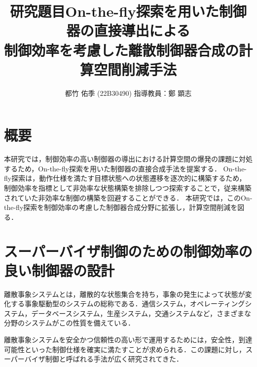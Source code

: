 \documentclass[11pt]{jarticle}
\begin{document}

\title{研究題目}
\title{On-the-fly探索を用いた制御器の直接導出による\\制御効率を考慮した離散制御器合成の計算空間削減手法}
\author{都竹 佑季 (22B30490) \;\; 指導教員：鄭 顕志}
\date{\empty} %
\maketitle %
\thispagestyle{fancy}


\section{概要} %
本研究では，制御効率の高い制御器の導出における計算空間の爆発の課題に対処するため，On-the-fly探索を用いた制御器の直接合成手法を提案する．
On-the-fly探索は，動作仕様を満たす目標状態への状態遷移を逐次的に構築するため，制御効率を指標として非効率な状態構築を排除しつつ探索することで，従来構築されていた非効率な制御の構築を回避することができる．
本研究では，このOn-the-fly探索を制御効率の考慮した制御器合成分野に拡張し，計算空間削減を図る．

\section{スーパーバイザ制御のための制御効率の良い制御器の設計}
離散事象システムとは，離散的な状態集合を持ち，事象の発生によって状態が変化する事象駆動型のシステムの総称である．通信システム，オペレーティングシステム，データベースシステム，生産システム，交通システムなど，さまざまな分野のシステムがこの性質を備えている．

離散事象システムを安全かつ信頼性の高い形で運用するためには，安全性，到達可能性といった制御仕様を確実に満たすことが求められる．この課題に対し，スーパーバイザ制御と呼ばれる手法が広く研究されてきた．
\end{document}
